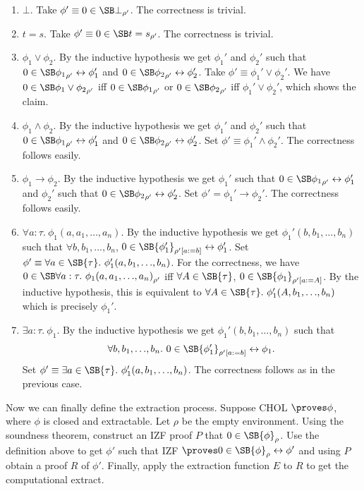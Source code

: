 \documentclass{LMCS}
\newcommand\iffl{\ensuremath{\leftrightarrow}}
\newcommand{\p}{\proves}
\newcommand{\sr}[1]{\SB{#1}_\rho}
\begin{document}
\begin{enumerate}[$\bullet$]
\item $\bot$. Take $\phi' \equiv 0 \in \srr{\bot}$. The correctness is trivial. 
\item $t = s$. Take $\phi' \equiv 0 \in \srr{t = s}$. The correctness is trivial. 
\item $\phi_1 \lor \phi_2$. By the inductive hypothesis we get $\phi_1'$ and
$\phi_2'$ such that $0 \in \srr{\phi_1} \iffl \phi_1'$ and $0 \in
\srr{\phi_2} \iffl \phi_2'$. Take $\phi' \equiv \phi_1' \lor \phi_2'$.
We have $0 \in \srr{\phi_1 \lor \phi_2}$ iff 
$0 \in \srr{\phi_1}$ or $0 \in \srr{\phi_2}$ iff $\phi_1' \lor \phi_2'$, which
shows the claim.
\item $\phi_1 \land \phi_2$. By the inductive hypothesis we get $\phi_1'$ and
$\phi_2'$ such that $0 \in \srr{\phi_1} \iffl \phi_1'$ and $0 \in \srr{\phi_2} \iffl \phi_2'$.
Set $\phi' \equiv  \phi_1' \land \phi_2'$. The correctness follows easily. 
\item $\phi_1 \to \phi_2$. By the inductive hypothesis we get $\phi_1'$
such that $0 \in \srr{\phi_1} \iffl \phi_1'$ and 
$\phi_2'$ such that $0 \in \srr{\phi_2} \iffl \phi_2'$. Set $\phi' = \phi_1'
\to \phi_2'$. The correctness follows easily. 
\item $\forall a : \tau.\ \phi_1(a, a_1, {\ldots} , a_n)$.
By the inductive hypothesis we get $\phi_1'(b, b_1, {\ldots} , b_n)$ such
that $\forall b, b_1, {\ldots} , b_n$, $0 \in \SB{\phi_1'}_{\rho'[a:=b]
} \iffl \phi_1'$. Set $\phi' \equiv \forall
a \in \SB{\tau}.\ \phi_1'(a, b_1, {\ldots} , b_n)$. For the correctness,
we have $0 \in \srr{\forall a : \tau.\
\phi_1(a, a_1, {\ldots} , a_n)}$ iff $\forall A \in \SB{\tau}$, $0 \in
\SB{\phi_1}_{\rho'[a:=A]}$. By the inductive
hypothesis, this is equivalent to $\forall A \in \SB{\tau}.\ \phi_1'(A,
b_1,{\ldots} , b_n)$ which is precisely $\phi_1'$. 
\item $\exists a : \tau.\ \phi_1$.
By the inductive hypothesis we get $\phi_1'(b, b_1, {\ldots} , b_n)$ such
that 
\[
\forall b, b_1, {\ldots} , b_n.\ 0 \in \SB{\phi_1'}_{\rho'[a:=b]} \iffl \phi_1.
\]
 Set $\phi' \equiv \exists a \in \SB{\tau}.\ \phi_1'(a, b_1, {\ldots} , b_n)$. The correctness follows
as in the previous case. 
\end{enumerate}

Now we can finally define the extraction process. Suppose CHOL $\p \phi$, where $\phi$
is closed and extractable. Let $\rho$ be the empty environment. Using the soundness theorem, construct an IZF proof $P$ that $0
\in \sr{\phi}$. Use the definition above to get $\phi'$ such that IZF $\p 0
\in \sr{\phi} \iffl \phi'$ and using $P$ obtain a proof $R$ of $\phi'$.
Finally, apply the extraction function $E$ to $R$ to get the computational extract.
\end{document}
